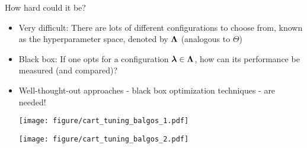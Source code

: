 \documentclass[11pt,compress,t,notes=noshow, xcolor=table]{beamer}
\begin{document}
	\begin{vbframe}{How hard could it be?}
		\begin{itemize}
			\item \small Very difficult: There are lots of different configurations to choose from, known as the hyperparameter space, denoted by $\bm{\Lambda}$ (analogous to $\Theta$)
			\item \small Black box: If one opts for a configuration $\bm{\lambda} \in \bm{\Lambda}$, how can its performance be measured (and compared)? 
			\item \small Well-thought-out approaches - black box optimization techniques - are needed!

		\begin{center}
			\vspace{4em}
			\begin{minipage}{0.46\textwidth}
				\texttt{[image: figure/cart\_tuning\_balgos\_1.pdf]}
			\end{minipage}
			\begin{minipage}{0.46\textwidth}
				\texttt{[image: figure/cart\_tuning\_balgos\_2.pdf]}
			\end{minipage}
		\end{center}

		\end{itemize}
	\end{vbframe}

	\endlecture
\end{document}
